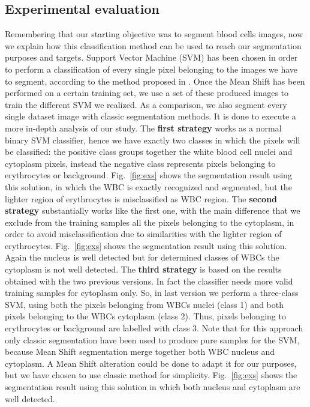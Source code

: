 \documentclass[final,a4paper,12pt,english]{UnicaPhdThesis3}
\begin{document}
	\subsection{Experimental evaluation}
	Remembering that our starting objective was to segment blood cells images, now we explain how this classification method can be used to reach our segmentation purposes and targets. Support Vector Machine (SVM) has been chosen in order to perform a classification of every single pixel belonging to the images we have to segment, according to the method proposed in \cite{Pan}. Once the Mean Shift has been performed on a certain training set, we use a set of these produced images to train the different SVM we realized. As a comparison, we also segment every single dataset image with classic segmentation methods. It is done to execute a more in-depth analysis of our study. The \textbf{first strategy} works as a normal binary SVM classifier, hence we have exactly two classes in which the pixels will be classified: the positive class groups together the white blood cell nuclei and cytoplasm pixels, instead the negative class represents pixels belonging to erythrocytes or background. Fig.~\ref{fig:exs} shows the segmentation result using this solution, in which the WBC is exactly recognized and segmented, but the lighter region of erythrocytes is misclassified as WBC region. The \textbf{second strategy} substantially works like the first one, with the main difference that we exclude from the training samples all the pixels belonging to the cytoplasm, in order to avoid misclassification due to similarities with the lighter region of erythrocytes. Fig.~\ref{fig:exs} shows the segmentation result using this solution. Again the nucleus is well detected but for determined classes of WBCs the cytoplasm is not well detected. The \textbf{third strategy} is based on the results obtained with the two previous versions. In fact the classifier needs more valid training samples for cytoplasm only. So, in last version we perform a three-class SVM, using both the pixels belonging from WBCs nuclei (class 1) and both pixels belonging to the WBCs cytoplasm (class 2). Thus, pixels belonging to erythrocytes or background are labelled with class 3. Note that for this approach only classic segmentation have been used to produce pure samples for the SVM, because Mean Shift segmentation merge together both WBC nucleus and cytoplasm. A Mean Shift alteration could be done to adapt it for our purposes, but we have chosen to use classic method for simplicity. Fig.~\ref{fig:exs} shows the segmentation result using this solution in which both nucleus and cytoplasm are well detected.
\end{document}
